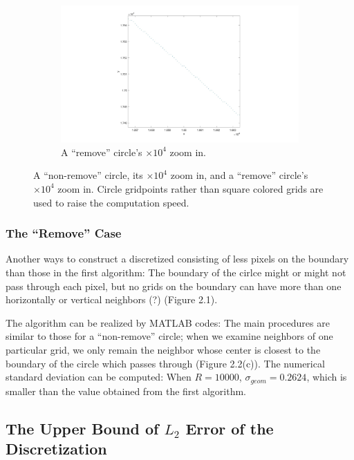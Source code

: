 \documentclass[letterpaper]{article}
\numberwithin{equation}{section} %
\numberwithin{figure}{section} %
\numberwithin{table}{section} %
\begin{document}
\begin{figure}[htbp]
	\begin{subfigure}[b]{0.4\textwidth}
		\includegraphics[width=\textwidth]{rmvCircleZI}
		\caption{A \enquote{remove} circle's $\times 10^4$ zoom in.}
		\label{rmvCircleZI}
	\end{subfigure}

	\caption{A \enquote{non-remove} circle, its $\times 10^4$ zoom in, and a \enquote{remove} circle's $\times 10^4$ zoom in. Circle gridpoints rather than square colored grids are used to raise the computation speed. }
	\label{circle and zoom in}
\end{figure}

	
\subsubsection{The \enquote{Remove} Case}

Another ways to construct a discretized consisting of less pixels on the boundary than those in the first algorithm: The boundary of the cirlce might or might not pass through each pixel, but no grids on the boundary can have more than one horizontally or vertical neighbors (?) (Figure 2.1).

The algorithm can be realized by MATLAB codes: The main procedures are similar to those for a \enquote{non-remove} circle; when we examine neighbors of one particular grid, we only remain the neighbor whose center is closest to the boundary of the circle which passes through (Figure 2.2(c)). The numerical standard deviation can be computed: When $R=10000$, $\sigma_{geom}=0.2624$, which is smaller than the value obtained from the first algorithm.

\subsection{The Upper Bound of $L_{2}$ Error of the Discretization}
\end{document}
